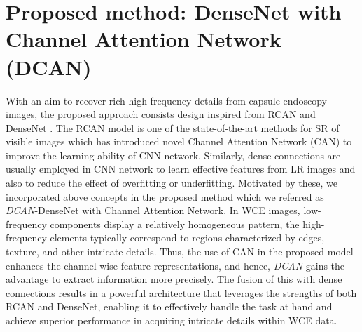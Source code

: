 \documentclass[conference]{IEEEtran}
\begin{document}
\section{Proposed method: DenseNet with Channel Attention Network (DCAN)}
With an aim to recover rich high-frequency details from capsule endoscopy images, the proposed approach consists design inspired from RCAN \cite{RCAN} and DenseNet \cite{SRDensenet}. The RCAN model is one of the state-of-the-art methods for SR of visible images which has introduced novel Channel Attention Network (CAN) to improve the learning ability of CNN network. Similarly, dense connections are usually employed in CNN network to learn effective features from LR images and also to reduce the effect of overfitting or underfitting.  Motivated by these, we incorporated above concepts in the proposed method which we referred as \emph{DCAN}-DenseNet with Channel Attention Network. In WCE images, low-frequency components display a relatively homogeneous pattern, the high-frequency elements typically correspond to regions characterized by edges, texture, and other intricate details. Thus, the use of CAN in the proposed model enhances the channel-wise feature representations, and hence, \emph{DCAN} gains the advantage to extract information more precisely. The fusion of this with dense connections results in a powerful architecture that leverages the strengths of both RCAN and DenseNet, enabling it to effectively handle the task at hand and achieve superior performance in acquiring intricate details within WCE data. 
\end{document}
